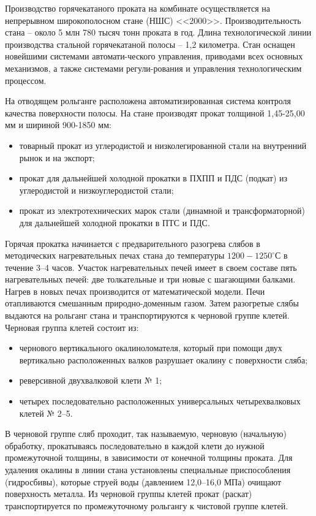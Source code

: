 Производство горячекатаного проката на комбинате осуществляется на непрерывном широкополосном стане (НШС) <<2000>>. Производительность стана – около 5 млн 780 тысяч тонн проката в год. Длина технологической линии производства стальной горячекатаной полосы – 1,2 километра. Стан оснащен новейшими системами автомати-ческого управления, приводами всех основных механизмов, а также системами регули-рования и управления технологическим процессом.

На отводящем рольганге расположена автоматизированная система контроля качества поверхности полосы. На стане производят прокат толщиной 1,45-25,00 мм и шириной 900-1850 мм:

\begin{itemize}
\item товарный прокат из углеродистой и низколегированной стали на внутренний рынок и на экспорт;
\item прокат для дальнейшей холодной прокатки в ПХПП и ПДС (подкат) из углеродистой и низкоуглеродистой стали;
\item прокат из электротехнических марок стали (динамной и трансформаторной) для дальнейшей холодной прокатки в ПТС и ПДС.
\end{itemize}

Горячая прокатка начинается с предварительного разогрева слябов в методических нагревательных печах стана до температуры $1200-1250^\circ$С в течение 3–4 часов. Участок нагревательных печей имеет в своем составе пять нагревательных печей: две толкательные и три новые с шагающими балками. Нагрев в новых печах производится от математической модели. Печи отапливаются смешанным природно-доменным газом. Затем разогретые слябы выдаются на рольганг стана и транспортируются к черновой группе клетей. Черновая группа клетей состоит из:

\begin{itemize}
\item чернового вертикального окалиноломателя, который при помощи двух вертикально расположенных валков разрушает окалину с поверхности сляба;
\item реверсивной двухвалковой клети № 1;
\item четырех последовательно расположенных универсальных четырехвалковых клетей № 2–5.
\end{itemize}


В черновой группе сляб проходит, так называемую, черновую (начальную) обработку, прокатываясь последовательно в каждой клети до нужной промежуточной толщины, в зависимости от конечной толщины проката. Для удаления окалины в линии стана установлены специальные приспособления (гидросбивы), которые струей воды (давлением 12,0–16,0 МПа) очищают поверхность металла. Из черновой группы клетей прокат (раскат) транспортируется по промежуточному рольгангу к чистовой группе клетей.

